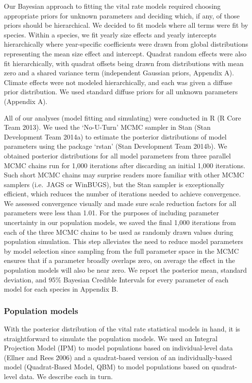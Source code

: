 \documentclass[12pt,]{article}
\begin{document}
Our Bayesian approach to fitting the vital rate models required choosing
appropriate priors for unknown parameters and deciding which, if any, of
those priors should be hierarchical. We decided to fit models where all
terms were fit by species. Within a species, we fit yearly size effects
and yearly intercepts hierarchically where year-specific coefficients
were drawn from global distributions representing the mean size effect
and intercept. Quadrat random effects were also fit hierarchically, with
quadrat offsets being drawn from distributions with mean zero and a
shared variance term (independent Gaussian priors, Appendix A). Climate
effects were not modeled hierarchically, and each was given a diffuse
prior distribution. We used standard diffuse priors for all unknown
parameters (Appendix A).

All of our analyses (model fitting and simulating) were conducted in R
(R Core Team 2013). We used the `No-U-Turn' MCMC sampler in Stan (Stan
Development Team 2014a) to estimate the posterior distributions of model
parameters using the package `rstan' (Stan Development Team 2014b). We
obtained posterior distributions for all model parameters from three
parallel MCMC chains run for 1,000 iterations after discarding an
initial 1,000 iterations. Such short MCMC chains may surprise readers
more familiar with other MCMC samplers (i.e.~JAGS or WinBUGS), but the
Stan sampler is exceptionally efficient, which reduces the number of
iterations needed to achieve convergence. We assessed convergence
visually and made sure scale reduction factors for all parameters were
less than 1.01. For the purposes of including parameter uncertainty in
our population models, we saved the final 1,000 iterations from each of
the three MCMC chains to be used as randomly drawn values during
population simulation. This step alleviates the need to reduce model
parameters by model selection since sampling from the full parameter
space in the MCMC ensures that if a parameter broadly overlaps zero, on
average the effect in the population models will also be near zero. We
report the posterior mean, standard deviation, and 95\% Bayesian
Credible Intervals for every parameter of each model for each species in
Appendix B.

\subsubsection{Population models}\label{population-models}

With the posterior distribution of the vital rate statistical models in
hand, it is straightforward to simulate the population models. We used
an Integral Projection Model (IPM) to model populations based on
individual-level data (Ellner and Rees 2006) and a quadrat-based version
of an individually-based model (Quadrat-Based Model, QBM) to model
populations based on quadrat-level data. We describe each in turn.
\end{document}
